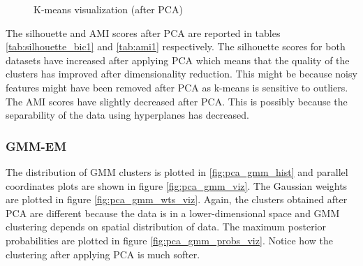 \documentclass[letterpaper]{article}
\begin{document}
\begin{figure}
\begin{minipage}{.5\textwidth}
		\end{minipage}
		\caption{K-means visualization (after PCA)}
		\label{fig:pca_kmeans_viz}
	\end{figure}

	The silhouette and AMI scores after PCA are reported in tables \ref{tab:silhouette_bic1} and \ref{tab:ami1} respectively. The silhouette scores for both datasets have increased after applying PCA which means that the quality of the clusters has improved after dimensionality reduction. This might be because noisy features might have been removed after PCA as k-means is sensitive to outliers. The AMI scores have slightly decreased after PCA. This is possibly because the separability of the data using hyperplanes has decreased.
	
	\subsubsection{GMM-EM}
	The distribution of GMM clusters is plotted in \ref{fig:pca_gmm_hist} and parallel coordinates plots are shown in figure \ref{fig:pca_gmm_viz}. The Gaussian weights are plotted in figure \ref{fig:pca_gmm_wts_viz}. Again, the clusters obtained after PCA are different because the data is in a lower-dimensional space and GMM clustering depends on spatial distribution of data. The maximum posterior probabilities are plotted in figure \ref{fig:pca_gmm_probs_viz}. Notice how the clustering after applying PCA is much softer.
	
\end{document}
